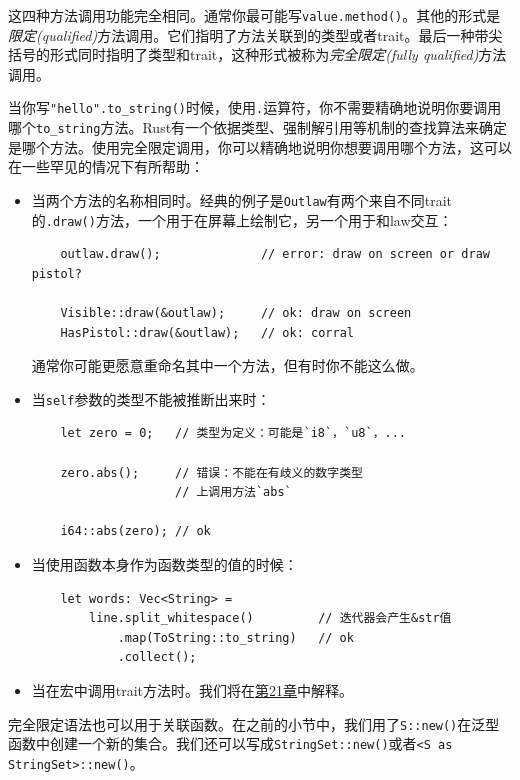 这四种方法调用功能完全相同。通常你最可能写\texttt{value.method()}。其他的形式是\emph{限定(qualified)}方法调用。它们指明了方法关联到的类型或者trait。最后一种带尖括号的形式同时指明了类型和trait，这种形式被称为\emph{完全限定(fully qualified)}方法调用。

当你写\texttt{"hello".to\_string()}时候，使用\texttt{.}运算符，你不需要精确地说明你要调用哪个\texttt{to\_string}方法。Rust有一个依据类型、强制解引用等机制的查找算法来确定是哪个方法。使用完全限定调用，你可以精确地说明你想要调用哪个方法，这可以在一些罕见的情况下有所帮助：
\begin{itemize}
    \item 当两个方法的名称相同时。经典的例子是\texttt{Outlaw}有两个来自不同trait的\texttt{.draw()}方法，一个用于在屏幕上绘制它，另一个用于和law交互：
    \begin{verbatim}
    outlaw.draw();              // error: draw on screen or draw pistol?

    Visible::draw(&outlaw);     // ok: draw on screen
    HasPistol::draw(&outlaw);   // ok: corral
    \end{verbatim}

    通常你可能更愿意重命名其中一个方法，但有时你不能这么做。

    \item 当\texttt{self}参数的类型不能被推断出来时：
    \begin{verbatim}
    let zero = 0;   // 类型为定义：可能是`i8`，`u8`，...

    zero.abs();     // 错误：不能在有歧义的数字类型
                    // 上调用方法`abs`

    i64::abs(zero); // ok
    \end{verbatim}

    \item 当使用函数本身作为函数类型的值的时候：
    \begin{verbatim}
    let words: Vec<String> =
        line.split_whitespace()         // 迭代器会产生&str值
            .map(ToString::to_string)   // ok
            .collect();
    \end{verbatim}

    \item 当在宏中调用trait方法时。我们将在\hyperref[ch21]{第21章}中解释。
\end{itemize}

完全限定语法也可以用于关联函数。在之前的小节中，我们用了\texttt{S::new()}在泛型函数中创建一个新的集合。我们还可以写成\texttt{StringSet::new()}或者\texttt{<S as StringSet>::new()}。

